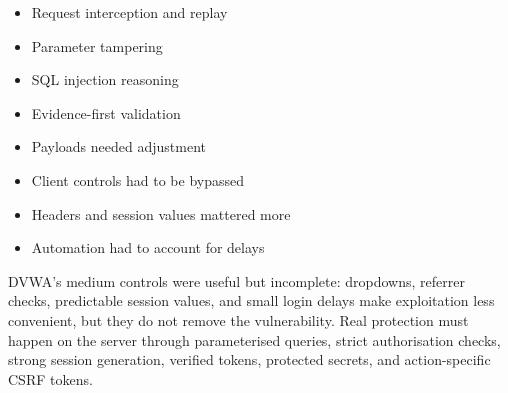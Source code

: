 \documentclass[11pt,a4paper]{report}
\begin{document}
        \vspace{0.2cm}

        \noindent
        \begin{minipage}[t]{0.48\textwidth}
        \begin{tcolorbox}[
            colback=lightgray!5,
            colframe=headerblack,
            title=\textbf{What Transferred},
            arc=1mm
        ]
        \begin{itemize}[leftmargin=*, itemsep=0.1cm]
            \item Request interception and replay
            \item Parameter tampering
            \item SQL injection reasoning
            \item Evidence-first validation
        \end{itemize}
        \end{tcolorbox}
        \end{minipage}
        \hfill
        \begin{minipage}[t]{0.48\textwidth}
        \begin{tcolorbox}[
            colback=lightgray!5,
            colframe=headerblack,
            title=\textbf{What Changed},
            arc=1mm
        ]
        \begin{itemize}[leftmargin=*, itemsep=0.1cm]
            \item Payloads needed adjustment
            \item Client controls had to be bypassed
            \item Headers and session values mattered more
            \item Automation had to account for delays
        \end{itemize}
        \end{tcolorbox}
        \end{minipage}

        \vspace{0.35cm}

        \begin{tcolorbox}[
            colback=lightgray!5,
            colframe=headerblack,
            title=\textbf{Main Defensive Conclusion},
            arc=1mm,
            boxrule=0.8pt
        ]
        DVWA's medium controls were useful but incomplete: dropdowns, referrer checks, predictable session values, and small login delays make exploitation less convenient, but they do not remove the vulnerability. Real protection must happen on the server through parameterised queries, strict authorisation checks, strong session generation, verified tokens, protected secrets, and action-specific CSRF tokens.
        \end{tcolorbox}
\end{document}
